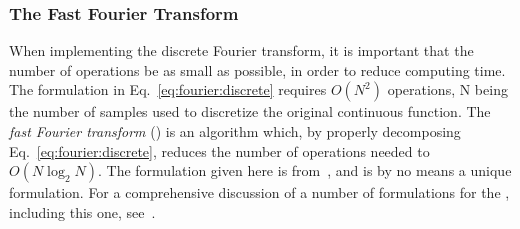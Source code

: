 \subsubsection{The Fast Fourier Transform}

When implementing the discrete Fourier transform, it is important that
the number of operations be as small as possible, in order to reduce
computing time.  The formulation in Eq.~\ref{eq:fourier:discrete}
requires $O(N^{2})$ operations, N being the number of samples used to
discretize the original continuous function.  The {\em fast Fourier
  transform\/} ({\fft}) is an algorithm which, by properly decomposing
Eq.~\ref{eq:fourier:discrete}, reduces the number of operations needed
to $O(N\log_{2}N)$.  The formulation given here is from~\cite{digim},
and is by no means a unique formulation.  For a comprehensive
discussion of a number of formulations for the {\fft}, including this
one, see~\cite{brigham}.

